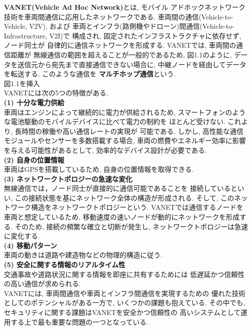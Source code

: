 \textbf{VANET(Vehicle Ad Hoc Network)}とは, モバイル
アドホックネットワーク技術を車両間通信に応用したネットワークである. 
\cite{adhoc, vanet} 車両間の通信(Vehicle-to-Vehicle, V2V), および
車両とインフラ(路側機やドローン)間通信(Vehicle-to-Infrastructure, V2I)\cite{drone}で
構成され, 固定されたインフラストラクチャに依存せず, ノード同士が
自律的に通信ネットワークを形成する. VANETでは, 車両間の通信距離が
無線通信の範囲を超えることが一般的であるため, 図1.1のように, 
データを送信元から宛先まで直接通信できない場合に, 
中継ノードを経由してデータを転送する. このような通信を
\textbf{マルチホップ通信}という.\\


{\Huge 図1.1を挿入}\\

VANETには次の5つの特徴がある.\\[0.5em]
\noindent\textbf{(1) 十分な電力供給}\\
\indent 車両はエンジンによって継続的に電力が供給されるため, 
スマートフォンのような電池駆動のモバイルデバイスに比べて電力の制約を
ほとんど受けない. これより, 長時間の稼働や高い通信レートの実現が
可能である. しかし, 高性能な通信モジュールやセンサーを多数搭載する場合, 
車両の燃費やエネルギー効率に影響を与える可能性があるとして, 
効率的なデバイス設計が必要である.\\[1em]
\noindent\textbf{(2) 自身の位置情報}\\
\indent 車両はGPSを搭載しているため,  自身の位置情報を取得できる.\\[1em]
\noindent\textbf{(3) ネットワークトポロジーの急速な変化}\\
\indent 無線通信では，ノード同士が直接的に通信可能であることを
接続しているといい, この接続状態を基にネットワーク全体の構造が形成される.
そして, このネットワーク構造をネットワークトポロジーという. 
VANETでは通信するノードを車両と想定しているため, 
移動速度の速いノードが動的にネットワークを形成する. 
そのため, 接続の頻繁な確立と切断が発生し, 
ネットワークトポロジーは急速に変化する. \\[1em]
\noindent\textbf{(4) 移動パターン}\\
\indent 車両の動きは道路や建造物などの物理的構造に従う.\\[1em]
\noindent\textbf{(5) 安全に関する情報のリアルタイム性}\\
\indent 交通事故や道路状況に関する情報を即座に共有するためには 
低遅延かつ信頼性の高い通信が求められる.\\

VANETには, 車両間通信や車両とインフラ間通信を実現するための
優れた技術としてのポテンシャルがある一方で, 
いくつかの課題も抱えている.
その中でも, セキュリティに関する課題はVANETを安全かつ信頼性の
高いシステムとして運用する上で最も重要な問題の一つとなっている.
\cite{vanet-challenge,vanet-security}\\

